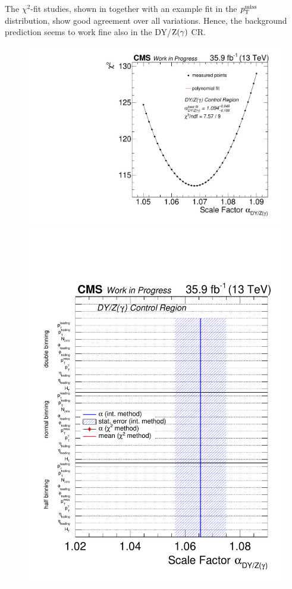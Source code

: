 The $\chi^2$-fit studies, shown in  together with an example fit in the $p_{\mathrm{T}}^\text{miss}$ distribution, show good agreement over all variations. Hence, the background prediction seems to work fine also in the DY/$\mathrm{Z}(\gamma)$ CR.

\begin{figure}[tbp]
 \centering
 \includegraphics[width=\pairwidth]{figures/plots_CR/chi/DY_LL_met}
 \includegraphics[width=\pairwidth]{figures/plots_CR/chi/DY_CompareLL}

\end{figure}

